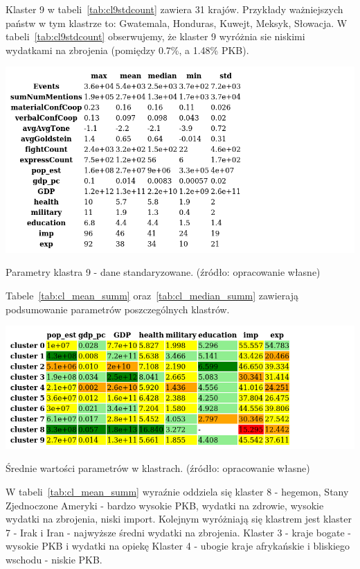 \documentclass[11pt]{report}
\begin{document}
    Klaster 9 w tabeli~\ref{tab:cl9stdcount} zawiera 31 krajów.
    Przykłady ważniejszych państw w tym klastrze to: Gwatemala, Honduras, Kuwejt, Meksyk, Słowacja.
    W tabeli~\ref{tab:cl9stdcount} obserwujemy, że klaster 9 wyróżnia sie niskimi wydatkami na zbrojenia (pomiędzy 0.7\%, a 1.48\% PKB).

    \begin{table}[!htp]
        \centering
        \includegraphics[width=\linewidth]{tables/CLUST/desc/clust9std_desc.png}
        \caption{Parametry klastra 9 - dane standaryzowane. (źródło: opracowanie własne)}
        \label{tab:cl9std_desc}
    \end{table}

    Tabele~\ref{tab:cl_mean_summ} oraz~\ref{tab:cl_median_summ} zawierają podsumowanie parametrów poszczególnych klastrów.

    \begin{table}[!htp]
        \centering
        \includegraphics[width=\linewidth]{tables/CLUST/desc/cluster_mean_summary.png}
        \caption{Średnie wartości parametrów w klastrach. (źródło: opracowanie własne)}
        \label{tab:cl_mean_summ}
    \end{table}

    W tabeli~\ref{tab:cl_mean_summ} wyraźnie oddziela się klaster 8 - hegemon, Stany Zjednoczone Ameryki - bardzo wysokie PKB, wydatki na zdrowie, wysokie wydatki na zbrojenia, niski import.
    Kolejnym wyróżniają się klastrem jest klaster 7 - Irak i Iran - najwyższe średni wydatki na zbrojenia.
    Klaster 3 - kraje bogate - wysokie PKB i wydatki na opiekę
    Klaster 4 - ubogie kraje afrykańskie i bliskiego wschodu - niskie PKB.
\end{document}

